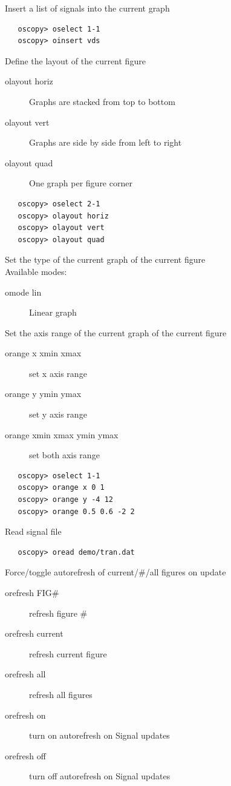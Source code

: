 \documentclass[a4paper,11pt]{article}
\begin{document}
   Insert a list of signals into the current graph
\begin{verbatim}
   oscopy> oselect 1-1
   oscopy> oinsert vds
\end{verbatim}

   Define the layout of the current figure
   \begin{description}
   \item[olayout horiz] Graphs are stacked from top to bottom
   \item[olayout vert] Graphs are side by side from left to right
   \item[olayout quad] One graph per figure corner
   \end{description}
\begin{verbatim}
   oscopy> oselect 2-1
   oscopy> olayout horiz
   oscopy> olayout vert
   oscopy> olayout quad
\end{verbatim}

   Set the type of the current graph of the current figure\\
   Available modes:
   \begin{description}
   \item[omode lin]      Linear graph
   \end{description}

   Set the axis range of the current graph of the current figure
   \begin{description}
   \item[orange x xmin xmax] set x axis range
   \item[orange y ymin ymax] set y axis range
   \item[orange xmin xmax ymin ymax] set both axis range
   \end{description}
\begin{verbatim}
   oscopy> oselect 1-1
   oscopy> orange x 0 1
   oscopy> orange y -4 12
   oscopy> orange 0.5 0.6 -2 2
\end{verbatim}

   Read signal file
\begin{verbatim}
   oscopy> oread demo/tran.dat
\end{verbatim}

   Force/toggle autorefresh of current/\#/all figures on update
   \begin{description}
   \item[orefresh FIG\#] refresh figure \#
   \item[orefresh current] refresh current figure
   \item[orefresh all]  refresh all figures
   \item[orefresh on] turn on autorefresh on Signal updates
   \item[orefresh off] turn off autorefresh on Signal updates
   \end{description}
\end{document}
